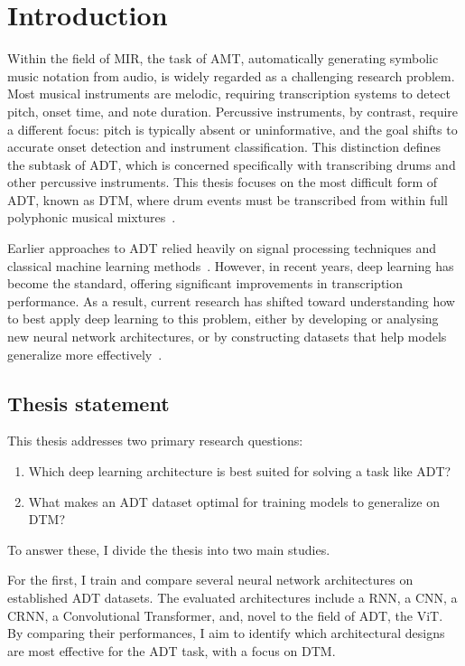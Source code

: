 \chapter{Introduction}

Within the field of \gls{MIR}, the task of \gls{AMT}, automatically generating symbolic music notation from audio, is widely regarded as a challenging research problem. Most musical instruments are melodic, requiring transcription systems to detect pitch, onset time, and note duration. Percussive instruments, by contrast, require a different focus: pitch is typically absent or uninformative, and the goal shifts to accurate onset detection and instrument classification. This distinction defines the subtask of \gls{ADT}, which is concerned specifically with transcribing drums and other percussive instruments. This thesis focuses on the most difficult form of \gls{ADT}, known as \gls{DTM}, where drum events must be transcribed from within full polyphonic musical mixtures~\cite{8350302}.

Earlier approaches to \gls{ADT} relied heavily on signal processing techniques and classical machine learning methods~\cite{8350302}. However, in recent years, deep learning has become the standard, offering significant improvements in transcription performance. As a result, current research has shifted toward understanding how to best apply deep learning to this problem, either by developing or analysing new neural network architectures, or by constructing datasets that help models generalize more effectively~\cite{signals4040042}.

\section{Thesis statement}

This thesis addresses two primary research questions:

\begin{enumerate}
    \item Which deep learning architecture is best suited for solving a task like \gls{ADT}?
    \item What makes an \gls{ADT} dataset optimal for training models to generalize on \gls{DTM}?
\end{enumerate}

To answer these, I divide the thesis into two main studies.

For the first, I train and compare several neural network architectures on established \gls{ADT} datasets. The evaluated architectures include a \acrlong{RNN}, a \acrlong{CNN}, a \acrlong{CRNN}, a Convolutional Transformer,  and, novel to the field of \gls{ADT}, the \acrlong{ViT}. By comparing their performances, I aim to identify which architectural designs are most effective for the \gls{ADT} task, with a focus on \gls{DTM}.

